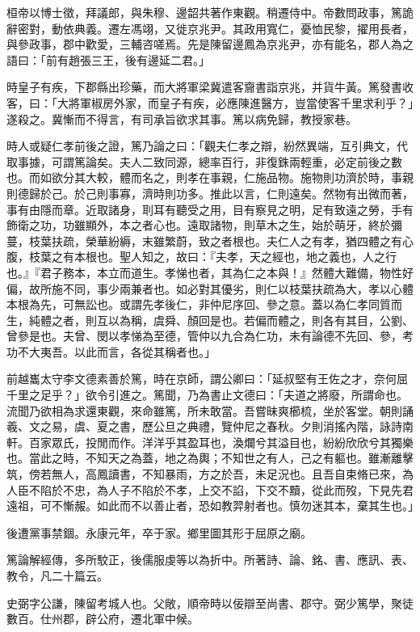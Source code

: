 \begin{pinyinscope}
桓帝以博士徵，拜議郎，與朱穆、邊韶共著作東觀。稍遷侍中。帝數問政事，篤詭辭密對，動依典義。遷左馮翊，又徙京兆尹。其政用寬仁，憂恤民黎，擢用長者，與參政事，郡中歡愛，三輔咨嗟焉。先是陳留邊鳳為京兆尹，亦有能名，郡人為之語曰：「前有趙張三王，後有邊延二君。」

時皇子有疾，下郡縣出珍藥，而大將軍梁冀遣客齎書詣京兆，并貨牛黃。篤發書收客，曰：「大將軍椒房外家，而皇子有疾，必應陳進醫方，豈當使客千里求利乎？」遂殺之。冀慚而不得言，有司承旨欲求其事。篤以病免歸，教授家巷。

時人或疑仁孝前後之證，篤乃論之曰：「觀夫仁孝之辯，紛然異端，互引典文，代取事據，可謂篤論矣。夫人二致同源，總率百行，非復銖兩輕重，必定前後之數也。而如欲分其大較，體而名之，則孝在事親，仁施品物。施物則功濟於時，事親則德歸於己。於己則事寡，濟時則功多。推此以言，仁則遠矣。然物有出微而著，事有由隱而章。近取諸身，刵耳有聽受之用，目有察見之明，足有致遠之勞，手有飾衛之功，功雖顯外，本之者心也。遠取諸物，則草木之生，始於萌牙，終於彌蔓，枝葉扶疏，榮華紛縟，末雖繁蔚，致之者根也。夫仁人之有孝，猶四體之有心腹，枝葉之有本根也。聖人知之，故曰：『夫孝，天之經也，地之義也，人之行也。』『君子務本，本立而道生。孝悌也者，其為仁之本與！』然體大難備，物性好偏，故所施不同，事少兩兼者也。如必對其優劣，則仁以枝葉扶疏為大，孝以心體本根為先，可無訟也。或謂先孝後仁，非仲尼序回、參之意。蓋以為仁孝同質而生，純體之者，則互以為稱，虞舜、顏回是也。若偏而體之，則各有其目，公劉、曾參是也。夫曾、閔以孝悌為至德，管仲以九合為仁功，未有論德不先回、參，考功不大夷吾。以此而言，各從其稱者也。」

前越巂太守李文德素善於篤，時在京師，謂公卿曰：「延叔堅有王佐之才，奈何屈千里之足乎？」欲令引進之。篤聞，乃為書止文德曰：「夫道之將廢，所謂命也。流聞乃欲相為求還東觀，來命雖篤，所未敢當。吾嘗昧爽櫛梳，坐於客堂。朝則誦羲、文之易，虞、夏之書，歷公旦之典禮，覽仲尼之春秋。夕則消搖內階，詠詩南軒。百家眾氏，投閒而作。洋洋乎其盈耳也，渙爛兮其溢目也，紛紛欣欣兮其獨樂也。當此之時，不知天之為蓋，地之為輿；不知世之有人，己之有軀也。雖漸離擊筑，傍若無人，高鳳讀書，不知暴雨，方之於吾，未足況也。且吾自束脩已來，為人臣不陷於不忠，為人子不陷於不孝，上交不諂，下交不黷，從此而歿，下見先君遠祖，可不慚赧。如此而不以善止者，恐如教羿射者也。慎勿迷其本，棄其生也。」

後遭黨事禁錮。永康元年，卒于家。鄉里圖其形于屈原之廟。

篤論解經傳，多所駮正，後儒服虔等以為折中。所著詩、論、銘、書、應訊、表、教令，凡二十篇云。

史弼字公謙，陳留考城人也。父敞，順帝時以佞辯至尚書、郡守。弼少篤學，聚徒數百。仕州郡，辟公府，遷北軍中候。


\end{pinyinscope}
